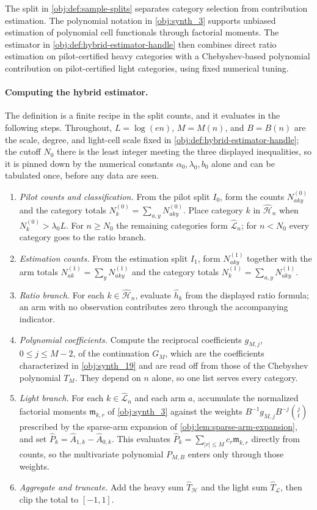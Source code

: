 \documentclass[11pt]{article}
\begin{document}
The split in \cref{obj:def:sample-splits} separates category selection from contribution estimation. The polynomial notation in \cref{obj:synth_3} supports unbiased estimation of polynomial cell functionals through factorial moments. The estimator in \cref{obj:def:hybrid-estimator-handle} then combines direct ratio estimation on pilot-certified heavy categories with a Chebyshev-based polynomial contribution on pilot-certified light categories, using fixed numerical tuning.

\paragraph{Computing the hybrid estimator.}
The definition is a finite recipe in the split counts, and it evaluates in the following steps. Throughout, \(L=\log(en)\), \(M=M(n)\), and \(B=B(n)\) are the scale, degree, and light-cell scale fixed in \cref{obj:def:hybrid-estimator-handle}; the cutoff \(N_0\) there is the least integer meeting the three displayed inequalities, so it is pinned down by the numerical constants \(\alpha_0,\lambda_0,b_0\) alone and can be tabulated once, before any data are seen.
\begin{enumerate}
\item \emph{Pilot counts and classification.} From the pilot split \(I_0\), form the counts \(N^{(0)}_{aky}\) and the category totals \(N^{(0)}_k=\sum_{a,y}N^{(0)}_{aky}\). Place category \(k\) in \(\widehat{\mathcal H}_n\) when \(N^{(0)}_k>\lambda_0L\). For \(n\ge N_0\) the remaining categories form \(\widehat{\mathcal L}_n\); for \(n<N_0\) every category goes to the ratio branch.
\item \emph{Estimation counts.} From the estimation split \(I_1\), form \(N^{(1)}_{aky}\) together with the arm totals \(N^{(1)}_{ak}=\sum_yN^{(1)}_{aky}\) and the category totals \(N^{(1)}_k=\sum_{a,y}N^{(1)}_{aky}\).
\item \emph{Ratio branch.} For each \(k\in\widehat{\mathcal H}_n\), evaluate \(\widehat h_k\) from the displayed ratio formula; an arm with no observation contributes zero through the accompanying indicator.
\item \emph{Polynomial coefficients.} Compute the reciprocal coefficients \(g_{M,j}\), \(0\le j\le M-2\), of the continuation \(G_M\), which are the coefficients characterized in \cref{obj:synth_19} and are read off from those of the Chebyshev polynomial \(T_M\). They depend on \(n\) alone, so one list serves every category.
\item \emph{Light branch.} For each \(k\in\widehat{\mathcal L}_n\) and each arm \(a\), accumulate the normalized factorial moments \(\mathfrak m_{k,r}\) of \cref{obj:synth_3} against the weights \(B^{-1}g_{M,j}B^{-j}\binom jt\) prescribed by the sparse-arm expansion of \cref{obj:lem:sparse-arm-expansion}, and set \(\widehat P_k=\widehat A_{1,k}-\widehat A_{0,k}\). This evaluates \(\widehat P_k=\sum_{|r|\le M}c_r\mathfrak m_{k,r}\) directly from counts, so the multivariate polynomial \(P_{M,B}\) enters only through those weights.
\item \emph{Aggregate and truncate.} Add the heavy sum \(\widehat T_{\mathcal H}\) and the light sum \(\widehat T_{\mathcal L}\), then clip the total to \([-1,1]\).
\end{enumerate}
\end{document}

